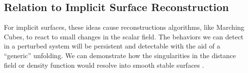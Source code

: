 \documentclass[12pt, a4paper, oneside]{book}
\theoremstyle{plain}
\theoremstyle{definition}
\newtheorem{definition}[theorem]{Definition}
\theoremstyle{remark}
\theoremstyle{definition}
\begin{document}
\subsection{Relation to Implicit Surface Reconstruction}

For implicit surfaces, these ideas cause reconstructions algorithms, like Marching Cubes, to react to small changes in the scalar field. The behaviors we can detect in a perturbed system will be persistent and detectable with the aid of a “generic” unfolding. We can demonstrate how the singularities in the distance field or density function would resolve into smooth stable surfaces \cite{ibanez2005shil, soncini2007mechanical}.

\end{document}
